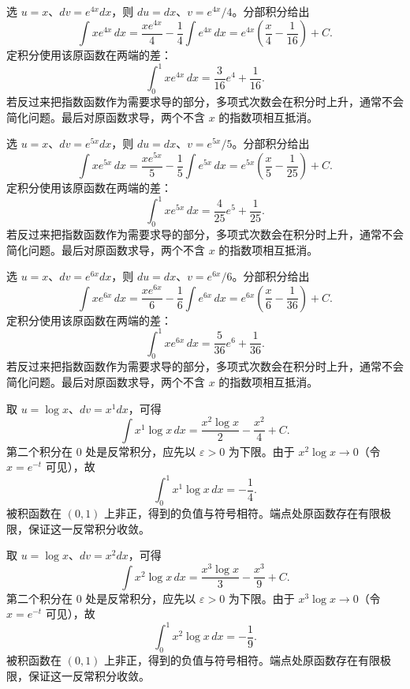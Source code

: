 \documentclass[12pt,fontset=fandol]{ctexart}
\begin{document}
\begin{solve}\label{ans:c13q4}
选 $u=x$、$dv=e^{4x}dx$，则 $du=dx$、$v=e^{4x}/4$。分部积分给出
\[
\int xe^{4x}\,dx=\frac{xe^{4x}}{4}-\frac1{4}\int e^{4x}\,dx=e^{4x}\left(\frac x{4}-\frac1{16}\right)+C.
\]
定积分使用该原函数在两端的差：
\[
\int_0^1xe^{4x}\,dx=\frac{3}{16}e^{4}+\frac{1}{16}.
\]
若反过来把指数函数作为需要求导的部分，多项式次数会在积分时上升，通常不会简化问题。最后对原函数求导，两个不含 $x$ 的指数项相互抵消。
\end{solve}

\begin{solve}\label{ans:c13q5}
选 $u=x$、$dv=e^{5x}dx$，则 $du=dx$、$v=e^{5x}/5$。分部积分给出
\[
\int xe^{5x}\,dx=\frac{xe^{5x}}{5}-\frac1{5}\int e^{5x}\,dx=e^{5x}\left(\frac x{5}-\frac1{25}\right)+C.
\]
定积分使用该原函数在两端的差：
\[
\int_0^1xe^{5x}\,dx=\frac{4}{25}e^{5}+\frac{1}{25}.
\]
若反过来把指数函数作为需要求导的部分，多项式次数会在积分时上升，通常不会简化问题。最后对原函数求导，两个不含 $x$ 的指数项相互抵消。
\end{solve}

\begin{solve}\label{ans:c13q6}
选 $u=x$、$dv=e^{6x}dx$，则 $du=dx$、$v=e^{6x}/6$。分部积分给出
\[
\int xe^{6x}\,dx=\frac{xe^{6x}}{6}-\frac1{6}\int e^{6x}\,dx=e^{6x}\left(\frac x{6}-\frac1{36}\right)+C.
\]
定积分使用该原函数在两端的差：
\[
\int_0^1xe^{6x}\,dx=\frac{5}{36}e^{6}+\frac{1}{36}.
\]
若反过来把指数函数作为需要求导的部分，多项式次数会在积分时上升，通常不会简化问题。最后对原函数求导，两个不含 $x$ 的指数项相互抵消。
\end{solve}

\begin{solve}\label{ans:c13q7}
取 $u=\log x$、$dv=x^{1}dx$，可得
\[
\int x^{1}\log x\,dx=\frac{x^{2}\log x}{2}-\frac{x^{2}}{4}+C.
\]
第二个积分在 $0$ 处是反常积分，应先以 $\varepsilon>0$ 为下限。由于 $x^{2}\log x\to0$（令 $x=e^{-t}$ 可见），故
\[
\int_0^1x^{1}\log x\,dx=-\frac{1}{4}.
\]
被积函数在 $(0,1)$ 上非正，得到的负值与符号相符。端点处原函数存在有限极限，保证这一反常积分收敛。
\end{solve}

\begin{solve}\label{ans:c13q8}
取 $u=\log x$、$dv=x^{2}dx$，可得
\[
\int x^{2}\log x\,dx=\frac{x^{3}\log x}{3}-\frac{x^{3}}{9}+C.
\]
第二个积分在 $0$ 处是反常积分，应先以 $\varepsilon>0$ 为下限。由于 $x^{3}\log x\to0$（令 $x=e^{-t}$ 可见），故
\[
\int_0^1x^{2}\log x\,dx=-\frac{1}{9}.
\]
被积函数在 $(0,1)$ 上非正，得到的负值与符号相符。端点处原函数存在有限极限，保证这一反常积分收敛。
\end{solve}
\end{document}
